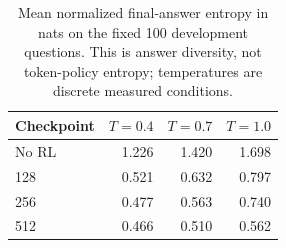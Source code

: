 \begin{table}[t]
\centering
\caption{Mean normalized final-answer entropy in nats on the fixed 100 development questions. This is answer diversity, not token-policy entropy; temperatures are discrete measured conditions.}
\label{tab:answer_diversity}
\footnotesize
\setlength{\tabcolsep}{4pt}
\begin{tabular}{lrrr}
\toprule
Checkpoint & $T=0.4$ & $T=0.7$ & $T=1.0$\\
\midrule
No RL & 1.226 & 1.420 & 1.698\\
128 & 0.521 & 0.632 & 0.797\\
256 & 0.477 & 0.563 & 0.740\\
512 & 0.466 & 0.510 & 0.562\\
\bottomrule
\end{tabular}
\end{table}
